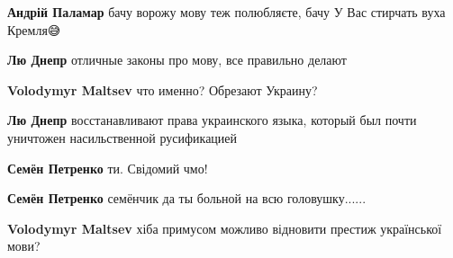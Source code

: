 \begin{itemize}
\begin{itemize}
\textbf{Андрій Паламар} бачу ворожу мову теж полюбляєте, бачу У Вас стирчать вуха Кремля😅

 
\textbf{Лю Днепр} отличные законы про мову, все правильно делают

 
\textbf{Volodymyr Maltsev} что именно? Обрезают Украину?

 
\textbf{Лю Днепр} восстанавливают права украинского языка, который был почти уничтожен насильственной русификацией

 
\textbf{Семён Петренко} ти. Свідомий чмо!

 
\textbf{Семён Петренко} семёнчик да ты больной на всю головушку...... \Laughey[1.0][white]

 
\textbf{Volodymyr Maltsev} хіба примусом можливо відновити престиж української мови?🤔


\end{itemize}
\end{itemize}
